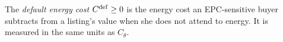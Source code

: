\label{def:default_cost}
The \emph{default energy cost} $C^{\rm def}\ge0$ is the energy cost an EPC-sensitive buyer subtracts from a listing's value when she does not attend to energy. It is measured in the same units as $C_\theta$.
